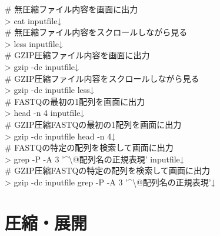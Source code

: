 \documentclass[titlepage,10pt,a4paper]{jsbook}
\newenvironment{cmd}{\begin{oframed}\raggedright\ttfamily\footnotesize\setlength{\baselineskip}{1.4em}}{\end{oframed}\vspace{-1em}}
\begin{document}
\begin{cmd}
\# 無圧縮ファイル内容を画面に出力\\
{\textgreater} cat inputfile↓\\
\# 無圧縮ファイル内容をスクロールしながら見る\\
{\textgreater} less inputfile↓\\
\# GZIP圧縮ファイル内容を画面に出力\\
{\textgreater} gzip -dc inputfile↓\\
\# GZIP圧縮ファイル内容をスクロールしながら見る\\
{\textgreater} gzip -dc inputfile {\textbar} less↓\\
\# FASTQの最初の1配列を画面に出力\\
{\textgreater} head -n 4 inputfile↓\\
\# GZIP圧縮FASTQの最初の1配列を画面に出力\\
{\textgreater} gzip -dc inputfile {\textbar} head -n 4↓\\
\# FASTQの特定の配列を検索して画面に出力\\
{\textgreater} grep -P -A 3 '{\textasciicircum}{\textbackslash}@配列名の正規表現' inputfile↓\\
\# GZIP圧縮FASTQの特定の配列を検索して画面に出力\\
{\textgreater} gzip -dc inputfile {\textbar} grep -P -A 3 '{\textasciicircum}{\textbackslash}@配列名の正規表現'↓
\end{cmd}

\section{圧縮・展開}
\end{document}
